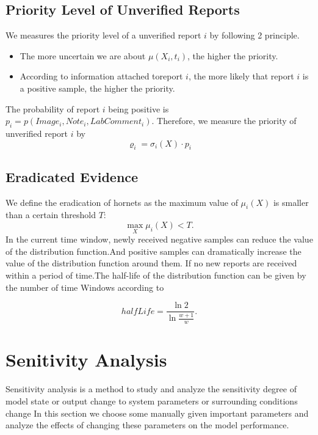\documentclass[12pt]{article}
\begin{document}
\subsection{Priority Level of Unverified Reports}
We measures the priority level of a unverified report $i$ by following 2 principle. 
\begin{itemize}
	\item The more uncertain we are about $\mu(X_i, t_i)$, the higher the priority.
	\item According to information attached toreport $i$, the more likely that report $i$ is a positive sample, the higher the priority.
\end{itemize}

The probability of report $i$ being positive is $p_i=p(Image_i, Note_i, LabComment_i)$. Therefore, we measure the priority of unverified report $i$ by
\begin{equation}
	\varrho_i = \sigma_i(X) \cdot p_i
	\label{priority}
\end{equation}

\subsection{Eradicated Evidence}
We define the eradication of hornets as the maximum value of $\mu_i(X)$ is smaller than a certain threshold $T$: 
\begin{equation}
	\max_X{\mu_i(X)} < T.
\end{equation}
In the current time window, newly received negative samples can reduce the value of the distribution function.And positive samples can dramatically increase the value of the distribution function around them. If no new reports are received within a period of time.The half-life of the distribution function can be given by the number of time Windows according to

\begin{equation}
	halfLife = \frac{\ln 2}{\ln{\frac{w+1}{w}} }.
\end{equation}

\section{Senitivity Analysis}\label{condition}
Sensitivity analysis is a method to study and analyze the sensitivity degree of model state or output change to system parameters or surrounding conditions change
In this section we choose some manually given important parameters and analyze the effects of changing these parameters on the model performance.
\end{document}
